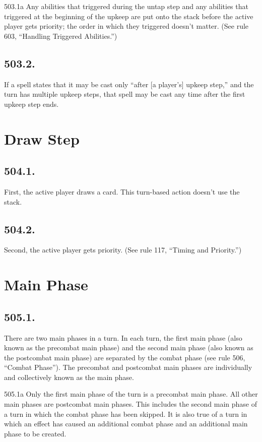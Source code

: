 503.1a Any abilities that triggered during the untap step and any abilities that triggered at the beginning of the upkeep are put onto the stack before the active player gets priority; the order in which they triggered doesn’t matter. (See rule 603, “Handling Triggered Abilities.”)

\subsection*{503.2.}
If a spell states that it may be cast only “after [a player’s] upkeep step,” and the turn has multiple upkeep steps, that spell may be cast any time after the first upkeep step ends.

\section{Draw Step}
\subsection*{504.1.}
First, the active player draws a card. This turn-based action doesn’t use the stack.

\subsection*{504.2.}
Second, the active player gets priority. (See rule 117, “Timing and Priority.”)

\section{Main Phase}
\subsection*{505.1.}
There are two main phases in a turn. In each turn, the first main phase (also known as the precombat main phase) and the second main phase (also known as the postcombat main phase) are separated by the combat phase (see rule 506, “Combat Phase”). The precombat and postcombat main phases are individually and collectively known as the main phase.

505.1a Only the first main phase of the turn is a precombat main phase. All other main phases are postcombat main phases. This includes the second main phase of a turn in which the combat phase has been skipped. It is also true of a turn in which an effect has caused an additional combat phase and an additional main phase to be created.


